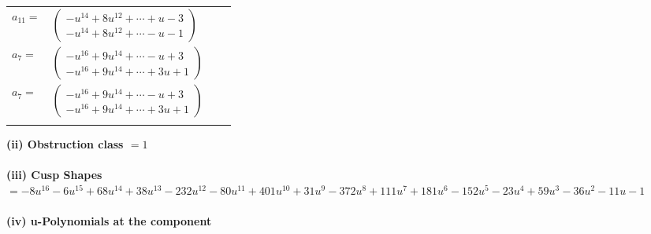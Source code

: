 \documentclass[1p]{elsarticle_modified}
\theoremstyle{definition}
\begin{document}
\begin{tabular}{m{7pt} m{180pt} m{7pt} m{180pt} }
\flushright $a_{11}=$&$\begin{pmatrix}- u^{14}+8 u^{12}+\cdots+u-3\\- u^{14}+8 u^{12}+\cdots- u-1\end{pmatrix}$ \\
\flushright $a_{7}=$&$\begin{pmatrix}- u^{16}+9 u^{14}+\cdots- u+3\\- u^{16}+9 u^{14}+\cdots+3 u+1\end{pmatrix}$\\ \flushright $a_{7}=$&$\begin{pmatrix}- u^{16}+9 u^{14}+\cdots- u+3\\- u^{16}+9 u^{14}+\cdots+3 u+1\end{pmatrix}$\\&\end{tabular}
\flushleft \textbf{(ii) Obstruction class $= 1$}\\~\\
\flushleft \textbf{(iii) Cusp Shapes $= -8 u^{16}-6 u^{15}+68 u^{14}+38 u^{13}-232 u^{12}-80 u^{11}+401 u^{10}+31 u^9-372 u^8+111 u^7+181 u^6-152 u^5-23 u^4+59 u^3-36 u^2-11 u-1$}\\~\\
\newpage\renewcommand{\arraystretch}{1}
\flushleft \textbf{(iv) u-Polynomials at the component}\newline \\
\end{document}
